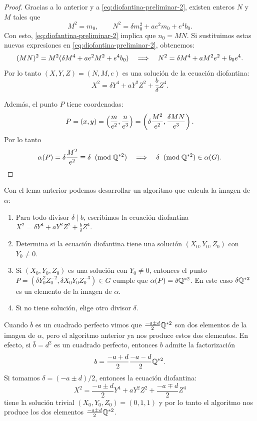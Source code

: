 \documentclass[../../tesis_maestria]{subfiles}
\begin{document}
\begin{proof}
Gracias a lo anterior y a \eqref{eq:diofantina-preliminar-2}, existen enteros $N$ y $M$ tales que
\[
	M^2=m_0,\qquad N^2=\delta m_0^2+ae^2m_0+e^4b_0.
\]
Con esto, \eqref{eq:diofantina-preliminar-2} implica que $n_0=MN$. Si sustituimos estas nuevas expresiones en \eqref{eq:diofantina-preliminar-2}, obtenemos:
\[
	(MN)^2=M^2(\delta M^4+ae^2M^2+e^4b_0)\quad\Longrightarrow\quad N^2=\delta M^4+aM^2e^2+b_0e^4.
\]
Por lo tanto  $(X,Y,Z)=(N,M,e)$ es una solución de la ecuación diofantina:
\[
	X^2=\delta Y^4+aY^2Z^2+\frac{b}{\delta}Z^4.
\]

Además, el punto $P$ tiene coordenadas:
\[
	P=(x,y)=\left( \frac{m}{e^2},\frac{n}{e^3} \right)=\left( \delta\frac{M^2}{e^2},\frac{\delta MN}{e^3} \right).
\]
Por lo tanto
\[
	\alpha(P)=\delta\frac{M^2}{e^2}\equiv \delta\;\;(\mathrm{mod}\; \mathbb{Q}^{*2}) \quad\Longrightarrow\quad \delta\;\;(\mathrm{mod}\; \mathbb{Q}^{*2})\in\alpha(G).
\]
\end{proof}

Con el lema anterior podemos desarrollar un algoritmo que calcula la imagen de $\alpha$:

\begin{enumerate}
	\item Para todo divisor $\delta\mid b$, escribimos la ecuación diofantina $X^2=\delta Y^4+aY^2Z^2+\frac{b}{\delta}Z^4$.
	\item Determina si la ecuación diofantina tiene una solución $(X_0,Y_0,Z_0)$ con $Y_0\neq0$.
	\item Si $(X_0,Y_0,Z_0)$ es una solución con $Y_0\neq0$, entonces el punto $P=(\delta Y_0^2Z_0^{-2},\delta X_0Y_0Z_0^{-3})\in G$ cumple que $\alpha(P)=\delta\mathbb{Q}^{*2}$. En este caso $\delta\mathbb{Q}^{*2}$ es un elemento de la imagen de $\alpha$.
	\item Si no tiene solución, elige otro divisor $\delta$. 
\end{enumerate}

\begin{nota}
	Cuando $\bar{b}$ es un cuadrado perfecto vimos que $\frac{-a\pm d}{2}\mathbb{Q}^{*2}$ son dos elementos de la imagen de $\alpha$, pero el algoritmo anterior ya nos produce estos dos elementos. En efecto, si $\bar{b}=d^2$ es un cuadrado perfecto, entonces $b$ admite la factorización
	\[
		b=\frac{-a+d}{2}\frac{-a-d}{2}\mathbb{Q}^{*2}.
	\]
	Si tomamos $\delta=(-a\pm d)/2$, entonces la ecuación diofantina:
	\[
		X^2=\frac{-a\pm d}{2} Y^4+aY^2Z^2+\frac{-a\mp d}{2}Z^4
	\]
	tiene la solución trivial $(X_0,Y_0,Z_0)=(0,1,1)$ y por lo tanto el algoritmo nos produce los dos elementos $\frac{-a\pm d}{2}\mathbb{Q}^{*2}$.
\end{nota}
\end{document}
